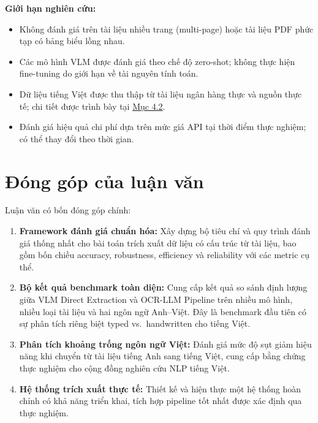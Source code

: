 ﻿\documentclass[12pt]{report}
\begin{document}
\noindent\textbf{Giới hạn nghiên cứu:}

\begin{itemize}
    \item Không đánh giá trên tài liệu nhiều trang (multi-page) hoặc tài liệu PDF phức tạp có bảng biểu lồng nhau.
    \item Các mô hình VLM được đánh giá theo chế độ zero-shot; không thực hiện fine-tuning do giới hạn về tài nguyên tính toán.
    \item Dữ liệu tiếng Việt được thu thập từ tài liệu ngân hàng thực và nguồn thực tế; chi tiết được trình bày tại \hyperref[sec:datasets]{Mục 4.2}.
    \item Đánh giá hiệu quả chi phí dựa trên mức giá API tại thời điểm thực nghiệm; có thể thay đổi theo thời gian.
\end{itemize}

\section{Đóng góp của luận văn}\label{sec:donggop}


Luận văn có bốn đóng góp chính:

\begin{enumerate}
    \item \textbf{Framework đánh giá chuẩn hóa:} Xây dựng bộ tiêu chí và quy trình đánh giá thống nhất cho bài toán trích xuất dữ liệu có cấu trúc từ tài liệu, bao gồm bốn chiều accuracy, robustness, efficiency và reliability với các metric cụ thể.

    \item \textbf{Bộ kết quả benchmark toàn diện:} Cung cấp kết quả so sánh định lượng giữa VLM Direct Extraction và OCR-LLM Pipeline trên nhiều mô hình, nhiều loại tài liệu và hai ngôn ngữ Anh--Việt. Đây là benchmark đầu tiên có sự phân tích riêng biệt typed vs.\ handwritten cho tiếng Việt.

    \item \textbf{Phân tích khoảng trống ngôn ngữ Việt:} Đánh giá mức độ sụt giảm hiệu năng khi chuyển từ tài liệu tiếng Anh sang tiếng Việt, cung cấp bằng chứng thực nghiệm cho cộng đồng nghiên cứu NLP tiếng Việt.

    \item \textbf{Hệ thống trích xuất thực tế:} Thiết kế và hiện thực một hệ thống hoàn chỉnh có khả năng triển khai, tích hợp pipeline tốt nhất được xác định qua thực nghiệm.
\end{enumerate}
\end{document}
